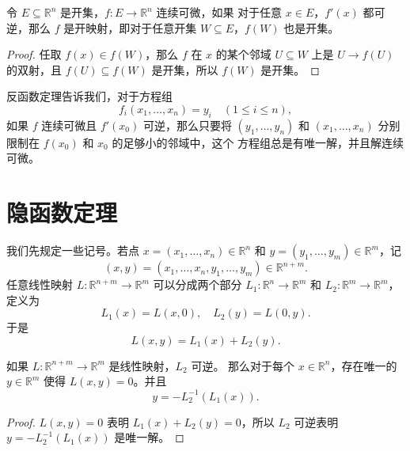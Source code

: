 \documentclass[fontset=none,zihao=-4]{Notes}
\begin{document}
\begin{corollary}\label{coro:coro of ift}
  令 $E\subseteq\mathbb{R}^n$ 是开集，$f:E\to\mathbb{R}^n$ 连续可微，如果
  对于任意 $x\in E$，$f'(x)$ 都可逆，那么 $f$ 是开映射，即对于任意开集
  $W\subseteq E$，$f(W)$ 也是开集。
\end{corollary}
\begin{proof}
  任取 $f(x)\in f(W)$，那么 $f$ 在 $x$ 的某个邻域 $U\subseteq W$ 上是 
  $U\to f(U)$ 的双射，且 $f(U)\subseteq f(W)$ 是开集，所以 $f(W)$ 是开集。
\end{proof}

反函数定理告诉我们，对于方程组
\[
  f_i(x_1,\dots,x_n)=y_i\quad (1\leq i\leq n),  
\]
如果 $f$ 连续可微且 $f'(x_0)$ 可逆，那么只要将 $(y_1,\dots,y_n)$ 
和 $(x_1,\dots,x_n)$ 分别限制在 $f(x_0)$ 和 $x_0$ 的足够小的邻域中，这个
方程组总是有唯一解，并且解连续可微。

\section{隐函数定理}

我们先规定一些记号。若点 $x=(x_1,\dots,x_n)\in\mathbb{R}^n$ 
和 $y=(y_1,\dots,y_m)\in \mathbb{R}^m$，记
\[
  (x,y)=(x_1,\dots,x_n,y_1,\dots,y_m)\in\mathbb{R}^{n+m}.  
\]
任意线性映射 $L:\mathbb{R}^{n+m}\to\mathbb{R}^m$ 可以分成两个部分
$L_1:\mathbb{R}^n\to\mathbb{R}^m$ 和 $L_2:\mathbb{R}^m\to\mathbb{R}^m$，定义为
\[
  L_1(x)=L(x,0),\quad L_2(y)=L(0,y).
\]
于是
\[
  L(x,y)=L_1(x)+L_2(y).  
\]

\begin{lemma}\label{lemma:implic lemma}
  如果 $L:\mathbb{R}^{n+m}\to\mathbb{R}^m$ 是线性映射，$L_2$ 可逆。
  那么对于每个 $x\in\mathbb{R}^n$，存在唯一的 $y\in\mathbb{R}^m$
  使得 $L(x,y)=0$。并且
  \[
    y=-L_2^{-1}(L_1(x)).  
  \]
\end{lemma}
\begin{proof}
  $L(x,y)=0$ 表明 $L_1(x)+L_2(y)=0$，所以 $L_2$ 可逆表明
  $y=-L_2^{-1}(L_1(x))$ 是唯一解。
\end{proof}
\end{document}

